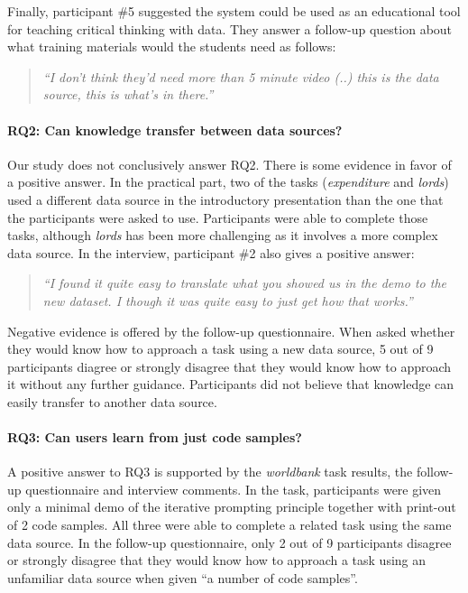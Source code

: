 \documentclass[manuscript,review,anonymous]{acmart}
\begin{document}
Finally, participant \#5 suggested the system could be used as an educational tool for teaching
critical thinking with data. They answer a follow-up question about what training materials would
the students need as follows:

\begin{quote}
\emph{``I don't think they'd need more than 5 minute video (..) this is the data
  source, this is what's in there.''}
\end{quote}

\paragraph{RQ2: Can knowledge transfer between data sources?}
Our study does not conclusively answer RQ2. There is some evidence in favor of a positive answer.
In the practical part, two of the tasks (\emph{expenditure} and \emph{lords}) used a different data
source in the introductory presentation than the one that the participants were asked to use.
Participants were able to complete those tasks, although \emph{lords} has been more challenging
as it involves a more complex data source. In the interview, participant \#2 also gives a positive
answer:

\begin{quote}
\emph{``I found it quite easy to translate what you showed us in the demo to the new dataset.
   I though it was quite easy to just get how that works.''}
\end{quote}

Negative evidence is offered by the follow-up questionnaire. When asked
whether they would know how to approach a task using a new data source, 5 out of 9 participants
diagree or strongly disagree that they would know how to approach it without any further guidance.
Participants did not believe that knowledge can easily transfer to another
data source.

\paragraph{RQ3: Can users learn from just code samples?}
A positive answer to RQ3 is supported by the \emph{worldbank} task results, the follow-up questionnaire
and interview comments. In the task, participants were given only a
minimal demo of the iterative prompting principle together with print-out of 2 code samples.
All three were able to complete a related task using the same data source. In the follow-up
questionnaire, only 2 out of 9 participants disagree or strongly disagree that
they would know how to approach a task using an unfamiliar data source when given ``a number
of code samples''.
\end{document}
